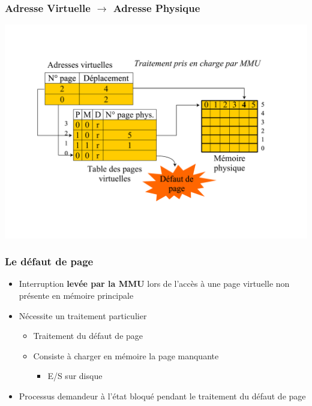 \begin{frame}
\frametitle{Adresse Virtuelle $\rightarrow$ Adresse Physique}
\includegraphics[width=\textwidth]{../illustration/table_pages_virtuelles_acces.pdf}
\end{frame}



\begin{frame}
\frametitle{Le défaut de page}
\begin{itemize}
\item Interruption \textbf{levée par la MMU} lors de l'accès à une page virtuelle non présente en mémoire principale
\item Nécessite un traitement particulier
\begin{itemize}
\item Traitement du défaut de page
\item Consiste à charger en mémoire la page manquante
\begin{itemize}
\item E/S sur disque
\end{itemize}
\end{itemize}
\item Processus demandeur à l'état bloqué pendant le traitement du défaut de page

\end{itemize}
\end{frame}




